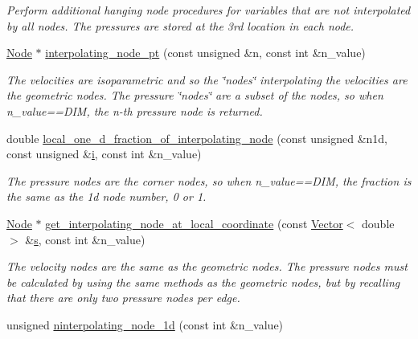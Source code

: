 \begin{DoxyCompactItemize}
\begin{DoxyCompactList}\small\item\em Perform additional hanging node procedures for variables that are not interpolated by all nodes. The pressures are stored at the 3rd location in each node. \end{DoxyCompactList}\item 
\hyperlink{classoomph_1_1Node}{Node} $\ast$ \hyperlink{classoomph_1_1RefineableAxisymmetricQTaylorHoodElement_a8545337ffdd94e8311b379f8762bb6af}{interpolating\+\_\+node\+\_\+pt} (const unsigned \&n, const int \&n\+\_\+value)
\begin{DoxyCompactList}\small\item\em The velocities are isoparametric and so the \char`\"{}nodes\char`\"{} interpolating the velocities are the geometric nodes. The pressure \char`\"{}nodes\char`\"{} are a subset of the nodes, so when n\+\_\+value==D\+IM, the n-\/th pressure node is returned. \end{DoxyCompactList}\item 
double \hyperlink{classoomph_1_1RefineableAxisymmetricQTaylorHoodElement_afab94536fc743be9392f97a482a9307c}{local\+\_\+one\+\_\+d\+\_\+fraction\+\_\+of\+\_\+interpolating\+\_\+node} (const unsigned \&n1d, const unsigned \&\hyperlink{cfortran_8h_adb50e893b86b3e55e751a42eab3cba82}{i}, const int \&n\+\_\+value)
\begin{DoxyCompactList}\small\item\em The pressure nodes are the corner nodes, so when n\+\_\+value==D\+IM, the fraction is the same as the 1d node number, 0 or 1. \end{DoxyCompactList}\item 
\hyperlink{classoomph_1_1Node}{Node} $\ast$ \hyperlink{classoomph_1_1RefineableAxisymmetricQTaylorHoodElement_a812a3d6cf7355efa12fe27f46143e981}{get\+\_\+interpolating\+\_\+node\+\_\+at\+\_\+local\+\_\+coordinate} (const \hyperlink{classoomph_1_1Vector}{Vector}$<$ double $>$ \&\hyperlink{cfortran_8h_ab7123126e4885ef647dd9c6e3807a21c}{s}, const int \&n\+\_\+value)
\begin{DoxyCompactList}\small\item\em The velocity nodes are the same as the geometric nodes. The pressure nodes must be calculated by using the same methods as the geometric nodes, but by recalling that there are only two pressure nodes per edge. \end{DoxyCompactList}\item 
unsigned \hyperlink{classoomph_1_1RefineableAxisymmetricQTaylorHoodElement_a7ceb3cf8da736561a0536aec2527ccd7}{ninterpolating\+\_\+node\+\_\+1d} (const int \&n\+\_\+value)

\end{DoxyCompactItemize}
